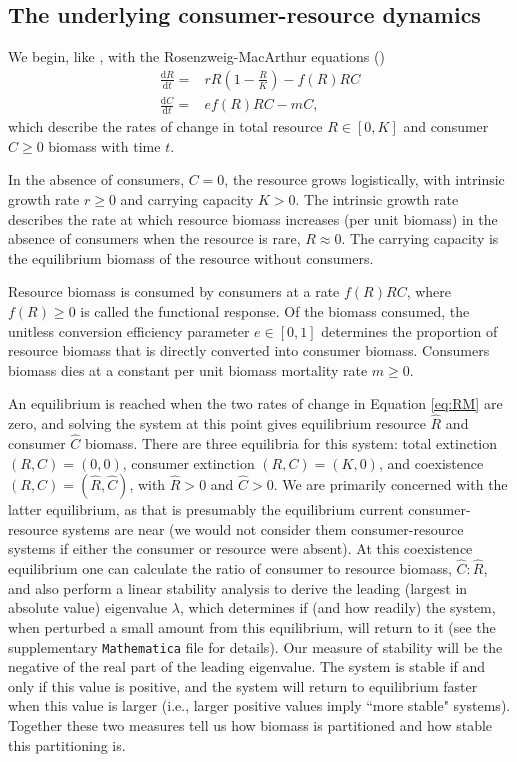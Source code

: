 \documentclass[11pt]{article}
\begin{document}
\subsection*{The underlying consumer-resource dynamics}

We begin, like \cite{Gilbert2014}, with the Rosenzweig-MacArthur equations (\cite{Rosenzweig1963})
\begin{equation}\label{eq:RM}
\begin{aligned}
\frac{\mathrm{d}R}{\mathrm{d}t} =& r R \left(1 - \frac{R}{K} \right) - f(R) R C\\
\frac{\mathrm{d}C}{\mathrm{d}t} =& e f(R) R C - m C,
\end{aligned}
\end{equation}
which describe the rates of change in total resource $R\in[0,K]$ and consumer $C\geq0$ biomass with time $t$.

In the absence of consumers, $C=0$, the resource grows logistically, with intrinsic growth rate $r\geq0$ and carrying capacity $K>0$.
The intrinsic growth rate describes the rate at which resource biomass increases (per unit biomass) in the absence of consumers when the resource is rare, $R\approx0$.
The carrying capacity is the equilibrium biomass of the resource without consumers.

Resource biomass is consumed by consumers at a rate $f(R) R C$, where $f(R)\geq0$ is called the functional response.
Of the biomass consumed, the unitless conversion efficiency parameter $e\in[0,1]$ determines the proportion of resource biomass that is directly converted into consumer biomass.
Consumers biomass dies at a constant per unit biomass mortality rate $m\geq0$.

An equilibrium is reached when the two rates of change in Equation \eqref{eq:RM} are zero, and solving the system at this point gives equilibrium resource $\hat{R}$ and consumer $\hat{C}$ biomass.
There are three equilibria for this system: total extinction $(R,C) = (0,0)$, consumer extinction $(R,C)=(K,0)$, and coexistence $(R,C)=(\hat{R},\hat{C})$, with $\hat{R}>0$ and $\hat{C}>0$.
We are primarily concerned with the latter equilibrium, as that is presumably the equilibrium current consumer-resource systems are near (we would not consider them consumer-resource systems if either the consumer or resource were absent).
At this coexistence equilibrium one can calculate the ratio of consumer to resource biomass, $\hat{C}:\hat{R}$, and also perform a linear stability analysis to derive the leading (largest in absolute value) eigenvalue $\lambda$, which determines if (and how readily) the system, when perturbed a small amount from this equilibrium, will return to it (see the supplementary \texttt{Mathematica} file for details).
Our measure of stability will be the negative of the real part of the leading eigenvalue.
The system is stable if and only if this value is positive, and the system will return to equilibrium faster when this value is larger (i.e., larger positive values imply ``more stable" systems).
Together these two measures tell us how biomass is partitioned and how stable this partitioning is.
\end{document}
